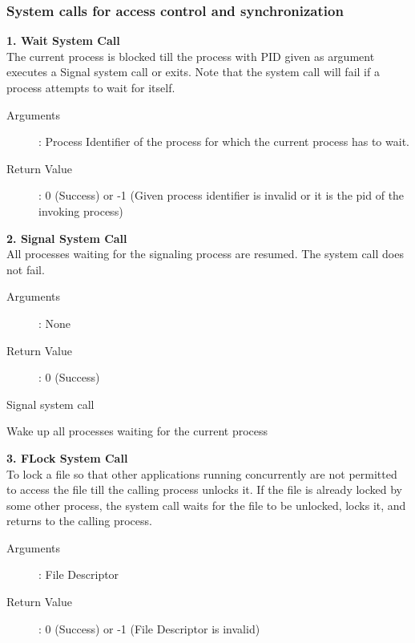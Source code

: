 \documentclass[11pt ,twosided]{article}
\begin{document}
\subsubsection{System calls for access control and synchronization}
\textbf{1. Wait System Call}
\\
The current process is blocked till the process with PID given as argument executes a Signal system call or exits. Note that the system call will fail if a process attempts to wait for itself.  
\begin{description}
\item[Arguments]: Process Identifier of the process for which the current process has to wait.
\item[Return Value]: 0 (Success) or -1 (Given process identifier is invalid or it is the pid of the invoking process)
\end{description} 

\textbf{2. Signal System Call}
\\
All processes waiting for the signaling process are resumed. The system call does not fail.
\begin{description}
\item[Arguments]: None
\item[Return Value]: 0 (Success) 
\end{description}
\iffalse
\begin{algorithm}
\caption{Signal system call}
\begin{algorithmic}
\STATE Wake up all processes waiting for the current process
\RETURN
\end{algorithmic}
\end{algorithm}
\vspace{8mm}
\textbf{3. FLock System Call}
\\
To lock a file so that other applications running concurrently are not permitted to access the file till the calling process unlocks it. If the file is already locked by some other process, the system call waits for the file to be unlocked, locks it, and returns to the calling process.   
\begin{description}
\item[Arguments]: File Descriptor
\item[Return Value]: 0 (Success) or -1 (File Descriptor is invalid)
\end{description} 
\end{document}
